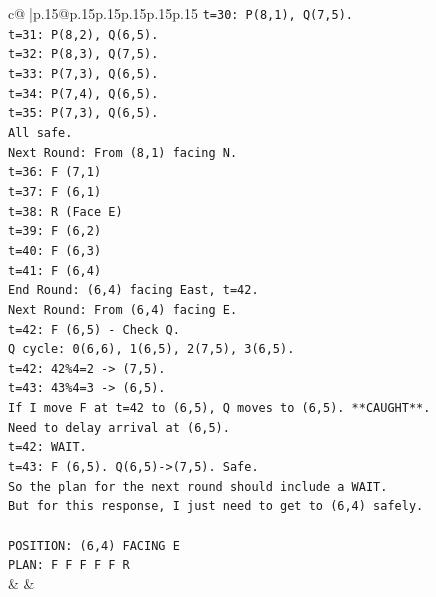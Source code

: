 \documentclass{article}
\begin{document}
{\begin{supertabular}{c@{$\;$}|p{.15\linewidth}@{}p{.15\linewidth}p{.15\linewidth}p{.15\linewidth}p{.15\linewidth}p{.15\linewidth}}
{{{\texttt{t=30: P(8,1), Q(7,5).} \\
\texttt{t=31: P(8,2), Q(6,5).} \\
\texttt{t=32: P(8,3), Q(7,5).} \\
\texttt{t=33: P(7,3), Q(6,5).} \\
\texttt{t=34: P(7,4), Q(6,5).} \\
\texttt{t=35: P(7,3), Q(6,5).} \\
\texttt{All safe.} \\
\texttt{Next Round: From (8,1) facing N.} \\
\texttt{t=36: F (7,1)} \\
\texttt{t=37: F (6,1)} \\
\texttt{t=38: R (Face E)} \\
\texttt{t=39: F (6,2)} \\
\texttt{t=40: F (6,3)} \\
\texttt{t=41: F (6,4)} \\
\texttt{End Round: (6,4) facing East, t=42.} \\
\texttt{Next Round: From (6,4) facing E.} \\
\texttt{t=42: F (6,5) {-} Check Q.} \\
\texttt{Q cycle: 0(6,6), 1(6,5), 2(7,5), 3(6,5).} \\
\texttt{t=42: 42\%4=2 {-}> (7,5).} \\
\texttt{t=43: 43\%4=3 {-}> (6,5).} \\
\texttt{If I move F at t=42 to (6,5), Q moves to (6,5). **CAUGHT**.} \\
\texttt{Need to delay arrival at (6,5).} \\
\texttt{t=42: WAIT.} \\
\texttt{t=43: F (6,5). Q(6,5){-}>(7,5). Safe.} \\
\texttt{So the plan for the next round should include a WAIT.} \\
\texttt{But for this response, I just need to get to (6,4) safely.} \\
\\ 
\texttt{POSITION: (6,4) FACING E} \\
\texttt{PLAN: F F F F F R} \\
            }
        }
    }
    & & \\ \\


\end{supertabular}}
\end{document}
